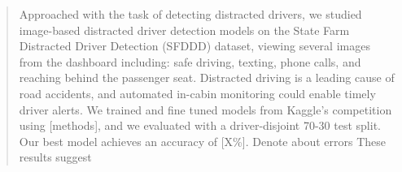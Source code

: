 \begin{abstract}
Approached with the task of detecting distracted drivers, we studied image-based distracted driver detection models on the State Farm Distracted Driver Detection (SFDDD) dataset, viewing several images from the dashboard including: safe driving, texting, phone calls, and reaching behind the passenger seat.
Distracted driving is a leading cause of road accidents, and automated in-cabin monitoring could enable timely driver alerts. 
We trained and fine tuned models from Kaggle's competition using [methods], and we evaluated with a driver-disjoint 70-30 test split.
Our best model achieves an accuracy of [X\%].
Denote about errors
These results suggest 
\end{abstract}


